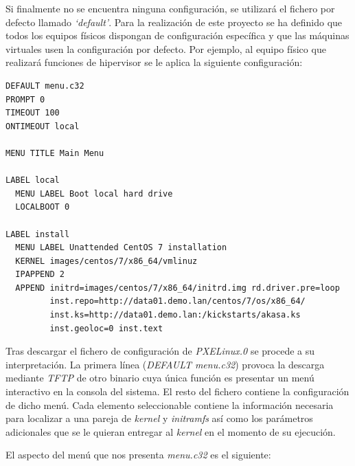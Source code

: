 \documentclass[a4paper,12pt,spanish,final]{epsc_tfc_pfc}
\begin{document}
Si finalmente no se encuentra ninguna configuración, se utilizará el fichero por defecto llamado \emph{`default'}. Para la realización de este proyecto se ha definido que todos los equipos físicos dispongan de configuración específica y que las máquinas virtuales usen la configuración por defecto. Por ejemplo, al equipo físico que realizará funciones de hipervisor se le aplica la siguiente configuración:\\

\begin{lstlisting}[style=dnsmasq]
DEFAULT menu.c32
PROMPT 0
TIMEOUT 100
ONTIMEOUT local

MENU TITLE Main Menu

LABEL local
  MENU LABEL Boot local hard drive
  LOCALBOOT 0

LABEL install
  MENU LABEL Unattended CentOS 7 installation
  KERNEL images/centos/7/x86_64/vmlinuz
  IPAPPEND 2
  APPEND initrd=images/centos/7/x86_64/initrd.img rd.driver.pre=loop
         inst.repo=http://data01.demo.lan/centos/7/os/x86_64/
         inst.ks=http://data01.demo.lan:/kickstarts/akasa.ks
         inst.geoloc=0 inst.text
\end{lstlisting}

Tras descargar el fichero de configuración de \emph{PXELinux.0} se procede a su interpretación. La primera línea (\emph{DEFAULT menu.c32}) provoca la descarga mediante \emph{TFTP} de otro binario cuya única función es presentar un menú interactivo en la consola del sistema. El resto del fichero contiene la configuración de dicho menú. Cada elemento seleccionable contiene la información necesaria para localizar a una pareja de \emph{kernel} y \emph{initramfs} así como los parámetros adicionales que se le quieran entregar al \emph{kernel} en el momento de su ejecución.

El aspecto del menú que nos presenta \emph{menu.c32} es el siguiente:\\
\end{document}
